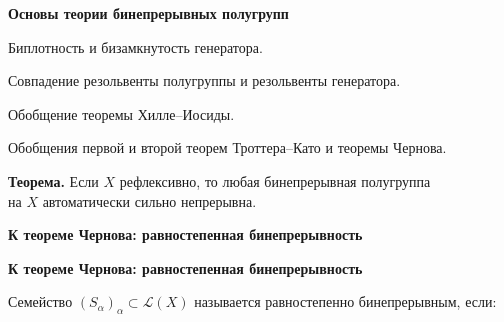 \documentclass[11pt]{article}
\begin{document}
\newpage

\begin{center}
{\color{notaeYELLOW}\bfseries\fontsize{44}{52}\selectfont Основы теории бинепрерывных полугрупп}
\end{center}
\vspace*{\fill}
\begin{center}
\fontsize{36}{43}\selectfont
\parbox{\linewidth}{\centering\noindent Биплотность и бизамкнутость генератора.
\par}\vspace{0.4in}
\parbox{\linewidth}{\centering\noindent Совпадение резольвенты полугруппы и резольвенты генератора.
\par}\vspace{0.4in}
\parbox{\linewidth}{\centering\noindent Обобщение теоремы Хилле--Иосиды.
\par}\vspace{0.4in}
\parbox{\linewidth}{\centering\noindent Обобщения первой и второй теорем Троттера--Като и теоремы Чернова.
\par}\vspace{0.4in}
\parbox{\linewidth}{\centering\noindent \textbf{Теорема.} Если $X$ рефлексивно, то любая бинепрерывная полугруппа\\ на $X$ автоматически сильно непрерывна.
\par}\vspace{0.4in}
\end{center}
\vspace*{\fill}

\newpage

\begin{center}
{\color{notaeYELLOW}\bfseries\fontsize{44}{52}\selectfont К теореме Чернова: равностепенная бинепрерывность}
\end{center}
\vspace*{\fill}
\begin{center}
\fontsize{36}{43}\selectfont
\end{center}
\vspace*{\fill}

\newpage

\begin{center}
{\color{notaeYELLOW}\bfseries\fontsize{44}{52}\selectfont К теореме Чернова: равностепенная бинепрерывность}
\end{center}
\vspace*{\fill}
\begin{center}
\fontsize{36}{43}\selectfont
\parbox{\linewidth}{\centering\noindent Семейство $(S_\alpha)_\alpha\subset\mathcal{L}(X)$ называется равностепенно бинепрерывным, если:
\par}\vspace{0.4in}
\end{center}
\vspace*{\fill}
\end{document}
